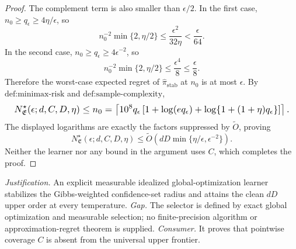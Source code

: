 \documentclass{article}
\begin{document}
\begin{proof}
The complement term is also smaller than \(\epsilon/2\). In the first case, \(n_0\ge q_\epsilon\ge4\eta/\epsilon\), so
\[
n_0^{-2}\min\{2,\eta/2\}
\le\frac{\epsilon^2}{32\eta}<\frac\epsilon{64}.
\]
In the second case, \(n_0\ge q_\epsilon\ge4\epsilon^{-2}\), so
\[
n_0^{-2}\min\{2,\eta/2\}
\le\frac{\epsilon^4}{8}\le\frac\epsilon8.
\]
Therefore the worst-case expected regret of \(\widehat\pi_{\mathrm{stab}}\) at \(n_0\) is at most \(\epsilon\). By \(\text{def:minimax-risk}\) and \(\text{def:sample-complexity}\),
\[
\makebox[\linewidth][c]{\resizebox{0.98\linewidth}{!}{\(\displaystyle N^\star_{\mathfrak E}(\epsilon;d,C,D,\eta)
\le n_0
=\left\lceil10^8q_\epsilon
\left[1+\log(eq_\epsilon)+\log\{1+(1+\eta)q_\epsilon\}\right]\right\rceil.\)}}
\]
The displayed logarithms are exactly the factors suppressed by \(\widetilde O\), proving
\[
N^\star_{\mathfrak E}(\epsilon;d,C,D,\eta)
\le\widetilde O\left(dD\min\{\eta/\epsilon,\epsilon^{-2}\}\right).
\]
Neither the learner nor any bound in the argument uses \(C\), which completes the proof.
\end{proof}
\par\smallskip\noindent \textit{Justification.} An explicit measurable idealized global-optimization learner stabilizes the Gibbs-weighted confidence-set radius and attains the clean \(dD\) upper order at every temperature. \textit{Gap.} The selector is defined by exact global optimization and measurable selection; no finite-precision algorithm or approximation-regret theorem is supplied. \textit{Consumer.} It proves that pointwise coverage \(C\) is absent from the universal upper frontier.
\end{document}
